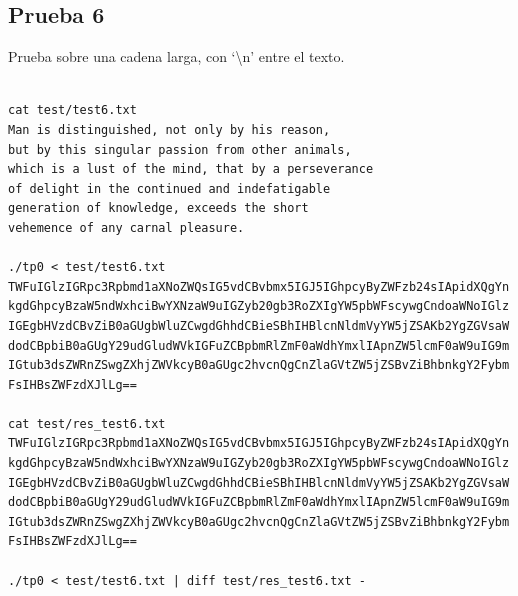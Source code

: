\documentclass[titlepage,a4paper]{article}
\begin{document}
\subsection{Prueba 6}
Prueba sobre una cadena larga, con `\textbackslash n' entre el texto.

\begin{lstlisting}[style=test_run_style]

cat test/test6.txt
Man is distinguished, not only by his reason, 
but by this singular passion from other animals, 
which is a lust of the mind, that by a perseverance 
of delight in the continued and indefatigable 
generation of knowledge, exceeds the short 
vehemence of any carnal pleasure.

./tp0 < test/test6.txt
TWFuIGlzIGRpc3Rpbmd1aXNoZWQsIG5vdCBvbmx5IGJ5IGhpcyByZWFzb24sIApidXQgYn 
kgdGhpcyBzaW5ndWxhciBwYXNzaW9uIGZyb20gb3RoZXIgYW5pbWFscywgCndoaWNoIGlz 
IGEgbHVzdCBvZiB0aGUgbWluZCwgdGhhdCBieSBhIHBlcnNldmVyYW5jZSAKb2YgZGVsaW 
dodCBpbiB0aGUgY29udGludWVkIGFuZCBpbmRlZmF0aWdhYmxlIApnZW5lcmF0aW9uIG9m 
IGtub3dsZWRnZSwgZXhjZWVkcyB0aGUgc2hvcnQgCnZlaGVtZW5jZSBvZiBhbnkgY2Fybm 
FsIHBsZWFzdXJlLg==

cat test/res_test6.txt
TWFuIGlzIGRpc3Rpbmd1aXNoZWQsIG5vdCBvbmx5IGJ5IGhpcyByZWFzb24sIApidXQgYn 
kgdGhpcyBzaW5ndWxhciBwYXNzaW9uIGZyb20gb3RoZXIgYW5pbWFscywgCndoaWNoIGlz 
IGEgbHVzdCBvZiB0aGUgbWluZCwgdGhhdCBieSBhIHBlcnNldmVyYW5jZSAKb2YgZGVsaW 
dodCBpbiB0aGUgY29udGludWVkIGFuZCBpbmRlZmF0aWdhYmxlIApnZW5lcmF0aW9uIG9m 
IGtub3dsZWRnZSwgZXhjZWVkcyB0aGUgc2hvcnQgCnZlaGVtZW5jZSBvZiBhbnkgY2Fybm 
FsIHBsZWFzdXJlLg==

./tp0 < test/test6.txt | diff test/res_test6.txt -

\end{lstlisting}
\end{document}
